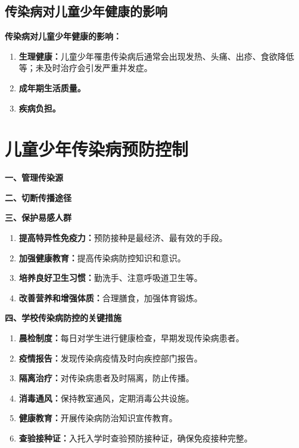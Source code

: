 \subsection{传染病对儿童少年健康的影响}

\begin{tipbox}
\textbf{传染病对儿童少年健康的影响：}

\begin{enumerate}[leftmargin=*]
    \item \textbf{生理健康：}儿童少年罹患传染病后通常会出现发热、头痛、出疹、食欲降低等；未及时治疗会引发严重并发症。
    \item \textbf{成年期生活质量。}
    \item \textbf{疾病负担。}
\end{enumerate}
\end{tipbox}

\section{儿童少年传染病预防控制}

\begin{keybox}
\textbf{一、管理传染源}

\textbf{二、切断传播途径}

\textbf{三、保护易感人群}
\begin{enumerate}[leftmargin=*]
    \item \textbf{提高特异性免疫力：}预防接种是最经济、最有效的手段。
    \item \textbf{加强健康教育：}提高传染病防控知识和意识。
    \item \textbf{培养良好卫生习惯：}勤洗手、注意呼吸道卫生等。
    \item \textbf{改善营养和增强体质：}合理膳食，加强体育锻炼。
\end{enumerate}

\textbf{四、学校传染病防控的关键措施}
\begin{enumerate}[leftmargin=*]
    \item \textbf{晨检制度：}每日对学生进行健康检查，早期发现传染病患者。
    \item \textbf{疫情报告：}发现传染病疫情及时向疾控部门报告。
    \item \textbf{隔离治疗：}对传染病患者及时隔离，防止传播。
    \item \textbf{消毒通风：}保持教室通风，定期消毒公共设施。
    \item \textbf{健康教育：}开展传染病防治知识宣传教育。
    \item \textbf{查验接种证：}入托入学时查验预防接种证，确保免疫接种完整。
\end{enumerate}
\end{keybox}

